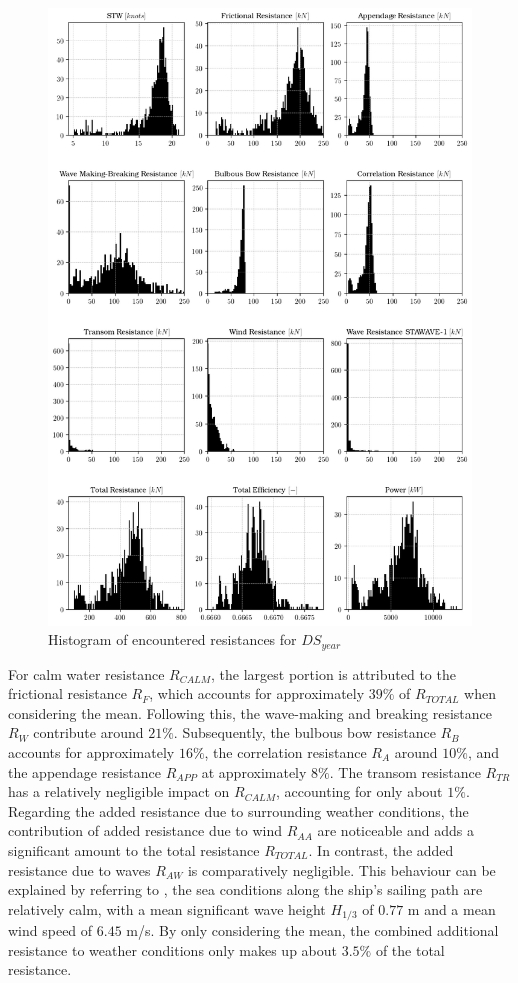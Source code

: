 \begin{figure}[h!]
    \centering
    \includegraphics[width=.9\linewidth]{02_figures/resistance_power_hist.png}
    \caption{Histogram of encountered resistances for $DS_{year}$}
    \label{fig:hist_resistance_power_yr}
\end{figure}

For calm water resistance $R_{CALM}$, the largest portion is attributed to the frictional resistance $R_F$, which accounts for approximately $39\%$ of $R_{TOTAL}$ when considering the mean. Following this, the wave-making and breaking resistance $R_W$ contribute around $21\%$. Subsequently, the bulbous bow resistance $R_{B}$ accounts for approximately $16\%$, the correlation resistance $R_{A}$ around $10\%$, and the appendage resistance $R_{APP}$ at approximately $8\%$. The transom resistance $R_{TR}$ has a relatively negligible impact on $R_{CALM}$, accounting for only about $1\%$.\\

Regarding the added resistance due to surrounding weather conditions, the contribution of added resistance due to wind $R_{AA}$ are noticeable and adds a significant amount to the total resistance $R_{TOTAL}$. In contrast, the added resistance due to waves $R_{AW}$ is comparatively negligible. This behaviour can be explained by referring to , the sea conditions along the ship's sailing path are relatively calm, with a mean significant wave height $H_{1/3}$ of $0.77$ m and a mean wind speed of $6.45$ m/s. By only considering the mean, the combined additional resistance to weather conditions only makes up about $3.5\%$ of the total resistance.\\

